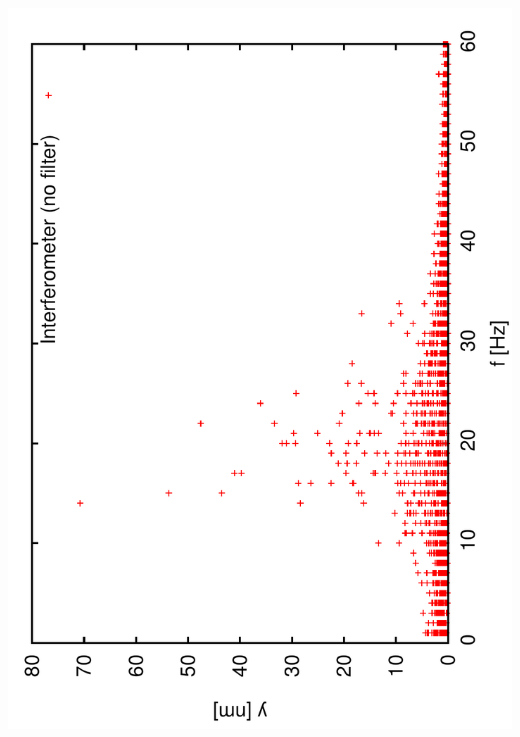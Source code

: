 \documentclass[a4paper,11pt]{book}
\begin{document}
\includegraphics[angle=-90,scale=0.20]{imagefft01.pdf}\\
\end{document}

